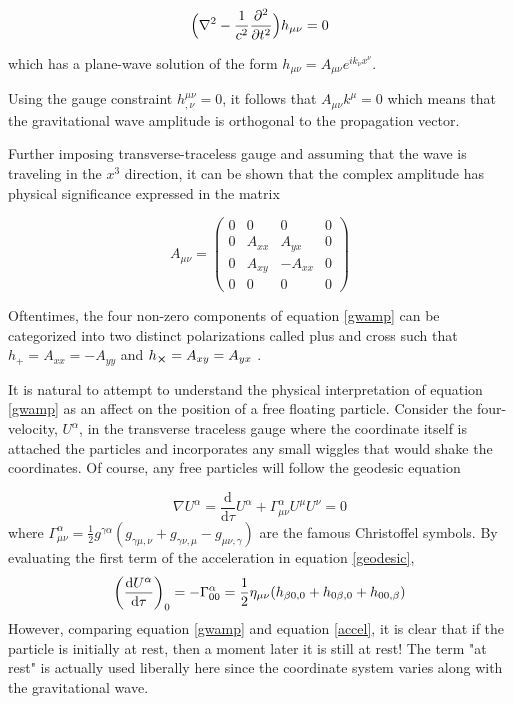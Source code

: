 	\begin{equation} \label{wave}
	\Big(\nabla^2 - \frac{1}{c^2} \pdv[2]{t} \Big) h_{\mu \nu}  = 0
	\end{equation}

	which has a plane-wave solution of the form $h_{\mu \nu} = A_{\mu \nu} e^{ik_{\nu} x^{\nu}}$. 
	
	Using the gauge constraint $h^{\mu \nu}_{,\nu} = 0$, it follows that $A_{\mu \nu} k^{\mu} = 0$ which means that the gravitational wave amplitude is orthogonal to the propagation vector.
	
	Further imposing transverse-traceless gauge and assuming that the wave is traveling in the $x^3$ direction, it can be shown that the complex amplitude has physical significance expressed in the matrix
	
	\begin{equation} \label{gwamp}
	A_{\mu \nu} = 
	\begin{pmatrix}
			0 &    0   &  0      & 0 
		 \\ 0 & A_{xx} &  A_{yx} & 0
		 \\ 0 & A_{xy} & -A_{xx} & 0
		 \\ 0 &    0   &  0      & 0
	\end{pmatrix}
	\end{equation}

	Oftentimes, the four non-zero components of equation \ref{gwamp} can be categorized into two distinct polarizations called plus and cross such that $h_{+} = A_{xx} = -A_{yy}$ and $h_{\cross} = A_{xy} = A_{yx}$ .

 
	It is natural to attempt to understand the physical interpretation of equation \ref{gwamp} as an affect on the position of a free floating particle. Consider the four-velocity, $U^{\alpha}$, in the transverse traceless gauge where the coordinate itself is attached the particles and incorporates any small wiggles that would shake the coordinates.  Of course, any free particles will follow the geodesic equation
	
	\begin{equation}\label{geodesic}
	\nabla U^{\alpha} = \frac{\text{d}}{\text{d} \tau} U^{\alpha} + \Gamma^{\alpha}_{\mu \nu} U^{\mu} U^{\nu} = 0
	\end{equation}	
	where $\Gamma^{\alpha}_{\mu \nu} = \frac{1}{2} g^{\gamma \alpha}(g_{\gamma \mu, \nu} + g_{\gamma \nu,\mu} - g_{\mu \nu, \gamma} )$ are the famous Christoffel symbols.
	By evaluating the first term of the acceleration in equation \ref{geodesic},
	\begin{equation}\label{accel}
	\bigg(\frac{\text{d}U^{\alpha}}{\text{d}\tau}\bigg)_0 = -\Gamma^{\alpha}_{00} 
	\\ = \frac{1}{2} \eta_{\mu \nu} (h_{\beta 0, 0} + h_{0 \beta, 0} + h_{0 0, \beta} )
	\end{equation}
	However, comparing equation \ref{gwamp} and equation \ref{accel}, it is clear that if the particle is initially at rest, then a moment later it is still at rest! The term "at rest" is actually used liberally here since the coordinate system varies along with the gravitational wave. 
	
